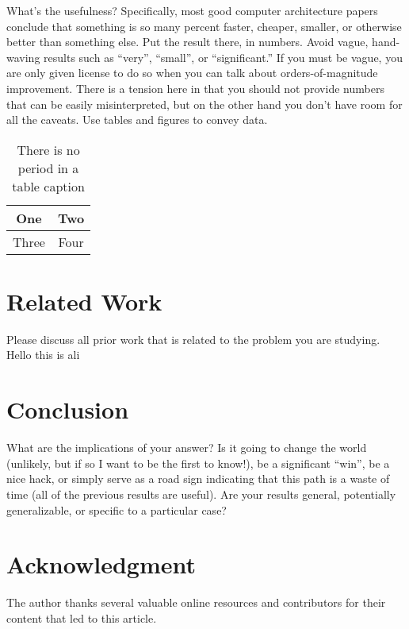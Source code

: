 \documentclass[conference]{IEEEtran}
\begin{document}
What's the usefulness? Specifically, most good computer architecture papers conclude that something is so many percent faster, cheaper, smaller, or otherwise better than something else. Put the result there, in numbers. Avoid vague, hand-waving results such as ``very'', ``small'', or ``significant.'' If you must be vague, you are only given license to do so when you can talk about orders-of-magnitude improvement. There is a tension here in that you should not provide numbers that can be easily misinterpreted, but on the other hand you don't have room for all the caveats. Use tables and figures to convey data.



\begin{table}[h]
\renewcommand{\arraystretch}{1.3}
\caption{There is no period in a table caption}
\label{table_example}
\centering
\begin{tabular}{|c||c|}
\hline
One & Two\\
\hline
Three & Four\\
\hline
\end{tabular}
\end{table}
\renewcommand{\arraystretch}{1}

\section{Related Work}

Please discuss all prior work that is related to the problem you are studying.
Hello this is ali
\section{Conclusion}

What are the implications of your answer? Is it going to change the world (unlikely, but if so I want to be the first to know!), be a significant ``win'', be a nice hack, or simply serve as a road sign indicating that this path is a waste of time (all of the previous results are useful). Are your results general, potentially generalizable, or specific to a particular case?

\section*{Acknowledgment}

The author thanks several valuable online resources and contributors for their content that led to this article.





\end{document}
